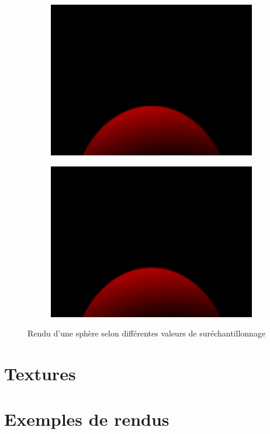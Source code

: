 \documentclass{article}
\begin{document}
\begin{figure}[hb]
  \begin{subfigure}{0.45\textwidth}
    \includegraphics[width=1\textwidth]{images/super3.png}
  \end{subfigure}
  \begin{subfigure}{0.45\textwidth}
    \includegraphics[width=1\textwidth]{images/super4.png}
  \end{subfigure}
  \caption{Rendu d'une sphère selon différentes valeurs de suréchantillonnage\label{superresults}}
\end{figure}

\section{Textures}

\section{Exemples de rendus}
\end{document}
